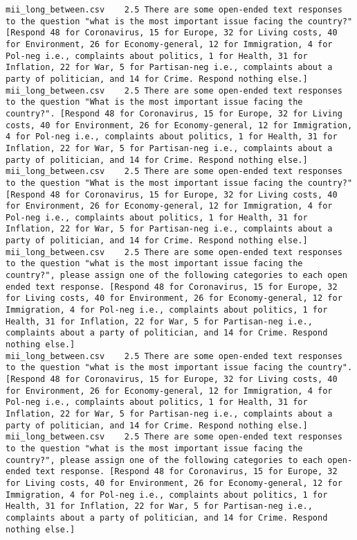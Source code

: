 \begin{lstlisting}
mii_long_between.csv	2.5	There are some open-ended text responses to the question "what is the most important issue facing the country?" [Respond 48 for Coronavirus, 15 for Europe, 32 for Living costs, 40 for Environment, 26 for Economy-general, 12 for Immigration, 4 for Pol-neg i.e., complaints about politics, 1 for Health, 31 for Inflation, 22 for War, 5 for Partisan-neg i.e., complaints about a party of politician, and 14 for Crime. Respond nothing else.]
mii_long_between.csv	2.5	There are some open-ended text responses to the question "What is the most important issue facing the country?". [Respond 48 for Coronavirus, 15 for Europe, 32 for Living costs, 40 for Environment, 26 for Economy-general, 12 for Immigration, 4 for Pol-neg i.e., complaints about politics, 1 for Health, 31 for Inflation, 22 for War, 5 for Partisan-neg i.e., complaints about a party of politician, and 14 for Crime. Respond nothing else.]
mii_long_between.csv	2.5	There are some open-ended text responses to the question "What is the most important issue facing the country?" [Respond 48 for Coronavirus, 15 for Europe, 32 for Living costs, 40 for Environment, 26 for Economy-general, 12 for Immigration, 4 for Pol-neg i.e., complaints about politics, 1 for Health, 31 for Inflation, 22 for War, 5 for Partisan-neg i.e., complaints about a party of politician, and 14 for Crime. Respond nothing else.]
mii_long_between.csv	2.5	There are some open-ended text responses to the question "what is the most important issue facing the country?", please assign one of the following categories to each open ended text response. [Respond 48 for Coronavirus, 15 for Europe, 32 for Living costs, 40 for Environment, 26 for Economy-general, 12 for Immigration, 4 for Pol-neg i.e., complaints about politics, 1 for Health, 31 for Inflation, 22 for War, 5 for Partisan-neg i.e., complaints about a party of politician, and 14 for Crime. Respond nothing else.]
mii_long_between.csv	2.5	There are some open-ended text responses to the question "what is the most important issue facing the country". [Respond 48 for Coronavirus, 15 for Europe, 32 for Living costs, 40 for Environment, 26 for Economy-general, 12 for Immigration, 4 for Pol-neg i.e., complaints about politics, 1 for Health, 31 for Inflation, 22 for War, 5 for Partisan-neg i.e., complaints about a party of politician, and 14 for Crime. Respond nothing else.]
mii_long_between.csv	2.5	There are some open-ended text responses to the question "what is the most important issue facing the country?", please assign one of the following categories to each open-ended text response. [Respond 48 for Coronavirus, 15 for Europe, 32 for Living costs, 40 for Environment, 26 for Economy-general, 12 for Immigration, 4 for Pol-neg i.e., complaints about politics, 1 for Health, 31 for Inflation, 22 for War, 5 for Partisan-neg i.e., complaints about a party of politician, and 14 for Crime. Respond nothing else.]

\end{lstlisting}
